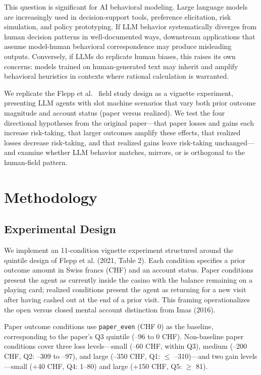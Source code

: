 \documentclass[midterm]{sparreport}
\begin{document}
This question is significant for AI behavioral modeling. Large language models are
increasingly used in decision-support tools, preference elicitation, risk
simulation, and policy prototyping. If LLM behavior systematically diverges from
human decision patterns in well-documented ways, downstream applications that
assume model-human behavioral correspondence may produce misleading outputs.
Conversely, if LLMs do replicate human biases, this raises its own concerns: models
trained on human-generated text may inherit and amplify behavioral heuristics in
contexts where rational calculation is warranted.

We replicate the Flepp et al.\ \cite{flepp-2021-effect} field study design as a vignette experiment,
presenting LLM agents with slot machine scenarios that vary both prior
outcome magnitude and account status (paper versus realized). We test the four
directional hypotheses from the original paper---that paper losses and gains each
increase risk-taking, that larger outcomes amplify these effects, that realized
losses decrease risk-taking, and that realized gains leave risk-taking unchanged---
and examine whether LLM behavior matches, mirrors, or is orthogonal to the
human-field pattern.

\section{Methodology}

\subsection{Experimental Design}

We implement an 11-condition vignette experiment structured around the quintile
design of Flepp et al. (2021, Table 2). Each condition specifies a prior outcome
amount in Swiss francs (CHF) and an account status. Paper conditions present the
agent as currently inside the casino with the balance remaining on a playing card;
realized conditions present the agent as returning for a new visit after having
cashed out at the end of a prior visit. This framing operationalizes the open versus
closed mental account distinction from Imas (2016).

Paper outcome conditions use \texttt{paper\_even} (CHF 0) as the baseline,
corresponding to the paper's Q3 quintile (--96 to 0 CHF). Non-baseline paper
conditions cover three loss levels---small (--60 CHF, within Q3), medium (--200
CHF, Q2: --309 to --97), and large (--350 CHF, Q1: $\leq$ --310)---and two gain
levels---small (+40 CHF, Q4: 1--80) and large (+150 CHF, Q5: $\geq$ 81).
\end{document}
